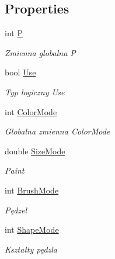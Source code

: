 \subsection*{Properties}
\begin{DoxyCompactItemize}
\item 
int \mbox{\hyperlink{class_r6_1_1_border_window_a67c1b3f2b97016169c2c6f44944886e3}{P}}
\begin{DoxyCompactList}\small\item\em Zmienna globalna P \end{DoxyCompactList}\item 
bool \mbox{\hyperlink{class_r6_1_1_border_window_a9b7f2a1fddfc5036c4f02413ad76533d}{Use}}
\begin{DoxyCompactList}\small\item\em Typ logiczny Use \end{DoxyCompactList}\item 
int \mbox{\hyperlink{class_r6_1_1_border_window_affd1225ea88517c68b765f71cbf5f58c}{Color\+Mode}}
\begin{DoxyCompactList}\small\item\em Globalna zmienna Color\+Mode \end{DoxyCompactList}\item 
double \mbox{\hyperlink{class_r6_1_1_border_window_a4f1a4e5f68aa130734eda8cc1cd58610}{Size\+Mode}}
\begin{DoxyCompactList}\small\item\em Paint \end{DoxyCompactList}\item 
int \mbox{\hyperlink{class_r6_1_1_border_window_abf05a9cb8322f14a0f769d90232223ff}{Brush\+Mode}}
\begin{DoxyCompactList}\small\item\em Pędzel \end{DoxyCompactList}\item 
int \mbox{\hyperlink{class_r6_1_1_border_window_a975d53917e4349a57833760f5b06aca1}{Shape\+Mode}}
\begin{DoxyCompactList}\small\item\em Kształty pędzla \end{DoxyCompactList}\end{DoxyCompactItemize}
